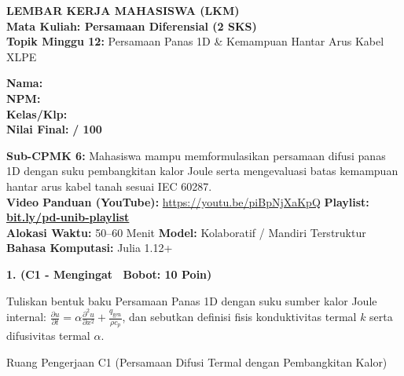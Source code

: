 \documentclass[10pt,a4paper]{article}
\begin{document}
\noindent\begin{minipage}[c]{0.68\textwidth}%
  {\large\textbf{\color{unibblue}LEMBAR KERJA MAHASISWA (LKM)}}\\[1mm]
  {\normalsize\textbf{Mata Kuliah: Persamaan Diferensial (2 SKS)}}\\[0.5mm]
  {\small\textbf{Topik Minggu 12:} Persamaan Panas 1D \& Kemampuan Hantar Arus Kabel XLPE}%
\end{minipage}%
\hfill%
\begin{minipage}[c]{0.30\textwidth}%
  \begin{tcolorbox}[colback=unibblue!5,colframe=unibblue,boxrule=0.6pt,arc=2pt,left=4pt,right=4pt,top=2pt,bottom=2pt]
    \scriptsize
    \textbf{Nama:} \dotfill\\[1.2mm]
    \textbf{NPM:} \dotfill\\[1.2mm]
    \textbf{Kelas/Klp:} \dotfill\\[1.2mm]
    \textbf{Nilai Final:} \hfill \textbf{/ 100}
  \end{tcolorbox}%
\end{minipage}\par

\vspace{1.5mm}

\begin{tcolorbox}[colback=boxbg,colframe=unibgold!90!black,boxrule=0.6pt,arc=2pt,left=5pt,right=5pt,top=3pt,bottom=3pt,title=\textbf{\scriptsize Capaian Pembelajaran (Sub-CPMK 6) \& Pedoman Evaluasi OBE}]
  \scriptsize
  \textbf{Sub-CPMK 6:} Mahasiswa mampu memformulasikan persamaan difusi panas 1D dengan suku pembangkitan kalor Joule serta mengevaluasi batas kemampuan hantar arus kabel tanah sesuai IEC 60287.\\
  \textbf{Video Panduan (YouTube):} \url{https://youtu.be/piBpNjXaKpQ} \hfill \textbf{Playlist:} \href{https://www.youtube.com/playlist?list=PLS5oOZWXZeTw}{\color{unibblue}\textbf{bit.ly/pd-unib-playlist}}\\\textbf{Alokasi Waktu:} 50--60 Menit \quad\textbar\quad \textbf{Model:} Kolaboratif / Mandiri Terstruktur \quad\textbar\quad \textbf{Bahasa Komputasi:} Julia 1.12+
\end{tcolorbox}

\vspace{1mm}

\noindent\textbf{1. (C1 - Mengingat \textbar\ Bobot: 10 Poin)}\par\vspace{0.5mm}
{\footnotesize Tuliskan bentuk baku Persamaan Panas 1D dengan suku sumber kalor Joule internal: $\frac{\partial u}{\partial t} = \alpha \frac{\partial^2 u}{\partial x^2} + \frac{q_{\text{gen}}}{\rho c_p}$, dan sebutkan definisi fisis konduktivitas termal $k$ serta difusivitas termal $\alpha$.}
\begin{answerbox}{Ruang Pengerjaan C1 (Persamaan Difusi Termal dengan Pembangkitan Kalor)}
  \vspace{2.0cm}
\end{answerbox}
\end{document}
